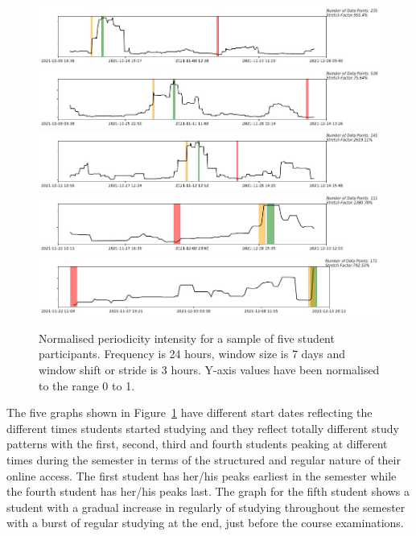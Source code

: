 \documentclass[preprints,article,accept,pdftex,moreauthors]{Definitions/mdpi}
\begin{document}
{\begin{figure}[H]
\centering
\includegraphics[width=\linewidth,trim={0 0 51mm 9mm},clip]{A2.jpeg}
\includegraphics[width=\linewidth,trim={0 0 51mm 9mm},clip]{A3.jpeg}
\includegraphics[width=\linewidth,trim={0 0 51mm 9mm},clip]{A4.jpeg}
\includegraphics[width=\linewidth,trim={0 0 51mm 9mm},clip]{A6.jpeg}
\includegraphics[width=\linewidth,trim={0 0 47.5mm 9mm},clip]{A5.jpeg}
\caption{{Normalised} periodicity intensity for a sample of five student participants. Frequency
is 24 hours, window size is 7 days and window shift or stride is 3 hours. {Y-axis values have been normalised to the range 0 to 1.}\label{fig:Student-participants}}
\end{figure}   

The five graphs shown in Figure~\ref{fig:Student-participants} have  different start dates reflecting the different times students started studying and they reflect totally different study patterns with the first, second, third and fourth students peaking at different times during the semester in terms of the structured and regular nature of their online access. The first {student has her/his peaks}  earliest {in the semester while}  the fourth {student has her/his peaks}  last. The graph for the fifth student shows a student with a gradual increase in regularly of studying throughout the semester with a burst of regular studying at the end, just before the course examinations.

}
\end{document}
